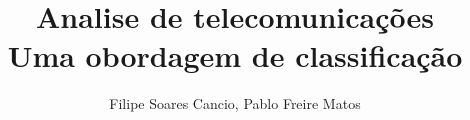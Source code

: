 \title{Analise de telecomunicações\\Uma obordagem de classificação}

\author{Filipe Soares Cancio, Pablo Freire Matos }


\address{Instituto Federal de Ecucação, Ciência e Tecnologia da Bahia (IFBA)\\
  Vitória da Conquista -- BA -- Brazil
	(UFRGS)\\
}
